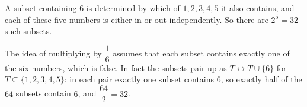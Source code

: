 A subset containing $6$ is determined by which of $1,2,3,4,5$ it also contains, and each of these five numbers is either in or out independently. So there are $2^5=\boxed{32}$ such subsets.

The idea of multiplying by $\dfrac16$ assumes that each subset contains exactly one of the six numbers, which is false. In fact the subsets pair up as $T\leftrightarrow T\cup\{6\}$ for $T\subseteq\{1,2,3,4,5\}$: in each pair exactly one subset contains $6$, so exactly half of the $64$ subsets contain $6$, and $\dfrac{64}{2}=32$.
